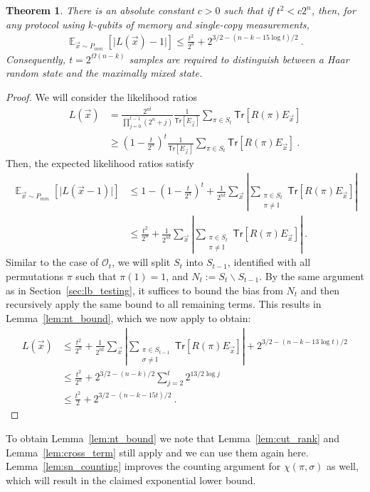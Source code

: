 \documentclass[11pt]{article}
\newtheorem{theorem}{Theorem}[section]
\newcommand{\E}{\mathop{\mathbb{E}}}
\newcommand{\id}{\ensuremath{\mathbb{I}}}
\newcommand{\Tr}{\mathsf{Tr}}
\newcommand{\Oc}{\mathcal{O}}
\begin{document}
\begin{theorem}\label{thm:purity_lb}
    There is an absolute constant $c > 0$ such that if $t^2 < c2^n$, then, for any protocol using $k$-qubits of memory and single-copy measurements,
    \begin{align}
        \E_{\vec{x}\sim P_{mm}}[\vert L(\vec{x})-1\vert] \leq \frac{t^2}{2^n} + 2^{3/2-(n-k-15\log t)/2}\ .
    \end{align}
    Consequently, $t = 2^{\Omega(n-k)}$ samples are required to distinguish between a Haar random state and the maximally mixed state.
\end{theorem}
\begin{proof}
    We will consider the likelihood ratios
    \begin{align}
        L(\vec{x}) & = \frac{2^{nt}}{\prod_{j=0}^{t-1}(2^n+j)} \frac{1}{\Tr[E_{\vec{x}}]}\sum_{\pi \in S_t} \Tr[R(\pi) E_{\vec{x}}] \\
        & \geq \left(1-\frac{t}{2^n} \right)^{t}\frac{1}{\Tr[E_{\vec{x}}]} \sum_{\pi \in S_t} \Tr[R(\pi) E_{\vec{x}}]\ .
    \end{align}
    Then, the expected likelihood ratios satisfy
    \begin{align}
        \E_{\vec{x}\sim P_{mm}}\left[\vert L(\vec{x}-1) \vert \right] & \leq 1-\left(1-\frac{t}{2^n} \right)^{t} + \frac{1}{2^{nt}}\sum_{\vec{x}} \left\vert \sum_{\substack{\pi \in S_t \\ \pi \neq \id }} \Tr[R(\pi) E_{\vec{x}}] \right\vert\\
        & \leq \frac{t^2}{2^n} + \frac{1}{2^{nt}}\sum_{\vec{x}} \left\vert \sum_{\substack{\pi \in S_t \\ \pi \neq \id }} \Tr[R(\pi) E_{\vec{x}}] \right\vert\ .
    \end{align}
    Similar to the case of $\Oc_t$, we will split $S_t$ into $S_{t-1}$, identified with all permutations $\pi$ such that $\pi(1) = 1$, and $N_t := S_t \backslash S_{t-1}$. By the same argument as in Section~\ref{sec:lb_testing}, it suffices to bound the bias from $N_t$ and then recursively apply the same bound to all remaining terms. This results in Lemma~\ref{lem:nt_bound}, which we now apply to obtain:
    \begin{align}
        L(\vec{x}) & \leq \frac{t^2}{2^n} + \frac{1}{2^{nt}}\sum_{\vec{x}} \left\vert \sum_{\substack{\pi \in S_{t-1} \\ \sigma \neq \id}} \Tr[R(\pi) E_{\vec{x}}] \right\vert + 2^{3/2-(n-k-13\log t)/2} \\ 
        & \leq \frac{t^2}{2^n} + 2^{3/2-(n-k)/2}\sum_{j=2}^t 2^{13/2 \log j}\\
        & \leq \frac{t^2}{2}+2^{3/2-(n-k - 15t)/2}\ .
    \end{align}
    \end{proof}
    To obtain Lemma~\ref{lem:nt_bound} we note that  Lemma~\ref{lem:cut_rank} and Lemma~\ref{lem:cross_term} still apply and we can use them again here. Lemma~\ref{lem:sn_counting} improves the counting argument for $\chi(\pi,\sigma)$ as well, which will result in the claimed exponential lower bound.
\end{document}
